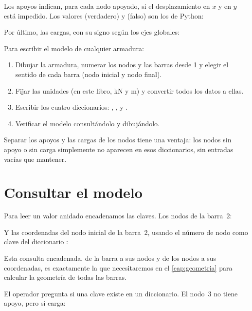 Los apoyos indican, para cada nodo apoyado, si el desplazamiento en $x$ y en
$y$ está impedido. Los valores  (verdadero) y  (falso) son
los  de Python:

Por último, las cargas, con su signo según los ejes globales:

\begin{estrategia}
Para escribir el modelo de cualquier armadura:
\begin{enumerate}
  \item Dibujar la armadura, numerar los nodos y las barras desde 1 y elegir
    el sentido de cada barra (nodo inicial y nodo final).
  \item Fijar las unidades (en este libro, \si{\kilo\newton} y \si{\metre}) y
    convertir todos los datos a ellas.
  \item Escribir los cuatro diccionarios: , ,
     y .
  \item Verificar el modelo consultándolo y dibujándolo.
\end{enumerate}
\end{estrategia}

Separar los apoyos y las cargas de los nodos tiene una ventaja: los nodos sin
apoyo o sin carga simplemente no aparecen en esos diccionarios, sin entradas
vacías que mantener.

\section{Consultar el modelo}\label{sec:consultar_modelo}

Para leer un valor anidado encadenamos las claves. Los nodos de la barra~2:

Y las coordenadas del nodo inicial de la barra~2, usando el número de nodo
como clave del diccionario :

Esta consulta encadenada, de la barra a sus nodos y de los nodos a sus
coordenadas, es exactamente la que necesitaremos en el
\cref{cap:geometria} para calcular la geometría de todas las barras.

El operador  pregunta si una clave existe en un diccionario. El nodo~3
no tiene apoyo, pero sí carga:

